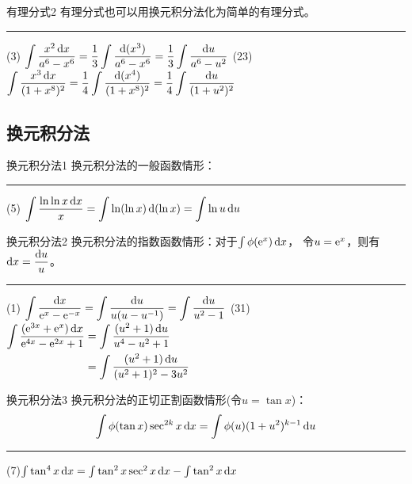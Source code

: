 \documentclass[14pt,notheorems,leqno,xcolor={rgb}]{beamer} %
\begin{document}
\begin{frame}{有理分式2}
有理分式也可以用换元积分法化为简单的有理分式。
\vspace{0.8em}\hrule\vspace{0.8em}\ppause
(3) $\displaystyle\int\frac{x^2\mathop{}\!\mathrm{d} x}{a^6-x^6}=\frac13\int\frac{\mathop{}\!\mathrm{d}(x^3)}{a^6-x^6}=\frac13\int\frac{\mathop{}\!\mathrm{d} u}{a^6-u^2}$\ppause
(23) $\displaystyle\int\frac{x^3\mathop{}\!\mathrm{d} x}{(1+x^8)^2}=\frac14\int\frac{\mathop{}\!\mathrm{d}(x^4)}{(1+x^8)^2}=\frac14\int\frac{\mathop{}\!\mathrm{d} u}{(1+u^2)^2}$
\end{frame}

\subsection{换元积分法}

\begin{frame}{换元积分法1}
换元积分法的一般函数情形：\par\scalebox{0.94}{\parbox{\linewidth}{%
\[ \bold{\int\phi(g(x))g'(x)\dx=\int\phi(g(x))\d(g(x))=\int\phi(u)\du} \]
}}\vspace{0.8em}\hrule\vspace{0.8em}\ppause
(5) $\begin{aligned}[t]\int\frac{\ln\ln x\mathop{}\!\mathrm{d} x}{x}&=\int\ln(\ln x)\mathop{}\!\mathrm{d}(\ln x)
  =\int\ln u\mathop{}\!\mathrm{d} u\end{aligned}$
\end{frame}

\begin{frame}{换元积分法2}
换元积分法的指数函数情形：对于$\int\phi(\mathrm{e}^x)\mathop{}\!\mathrm{d} x$，
令$u=\mathrm{e}^x$，则有$\mathop{}\!\mathrm{d} x=\dfrac{\mathop{}\!\mathrm{d} u}{u}$。
\vspace{0.4em}\hrule\vspace{0.4em}\ppause
(1) $\displaystyle\int\frac{\mathop{}\!\mathrm{d} x}{\mathrm{e}^x-\mathrm{e}^{-x}}=\int\frac{\mathop{}\!\mathrm{d} u}{u(u-u^{-1})}=\int\frac{\mathop{}\!\mathrm{d} u}{u^2-1}$\vpause
(31) $\begin{aligned}[t]\int\frac{(\mathrm{e}^{3x}+\mathrm{e}^x)\mathop{}\!\mathrm{d} x}{\mathrm{e}^{4x}-\mathrm{e}^{2x}+1}
    &=\int\frac{(u^2+1)\mathop{}\!\mathrm{d} u}{u^4-u^2+1}\\
    &=\int\frac{(u^2+1)\mathop{}\!\mathrm{d} u}{(u^2+1)^2-3u^2}\end{aligned}$
\end{frame}

\begin{frame}{换元积分法3}
换元积分法的正切正割函数情形(令$u=\tan x$)：
\[ \int\phi(\tan x)\sec^{2k} x\mathop{}\!\mathrm{d} x =\int\phi(u)(1+u^2)^{k-1}\mathop{}\!\mathrm{d} u \]
\vspace{0.8em}\hrule\vspace{0.8em}\ppause
(7)\enspace$\int\tan^4 x\mathop{}\!\mathrm{d} x=\int \tan^2 x\sec^2 x\mathop{}\!\mathrm{d} x-\int \tan^2 x \mathop{}\!\mathrm{d} x$
\end{frame}
\end{document}
